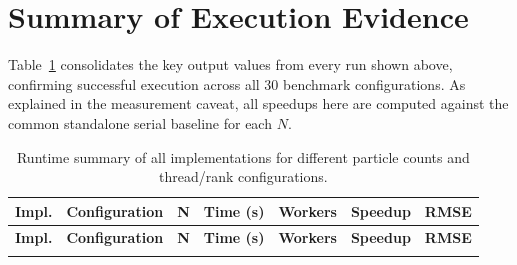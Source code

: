 \documentclass[11pt,a4paper]{article}
\begin{document}
\section{Summary of Execution Evidence}
\label{sec:summary}

Table~\ref{tab:summary} consolidates the key output values from every run
shown above, confirming successful execution across all 30 benchmark
configurations. As explained in the measurement caveat, all speedups here are
computed against the common standalone serial baseline for each $N$.

\begin{longtable}{llrrrrl}
\caption{Runtime summary of all implementations for different particle counts
and thread/rank configurations.}
\label{tab:summary}\\
\toprule
\textbf{Impl.} & \textbf{Configuration} & \textbf{N} & \textbf{Time (s)} &
\textbf{Workers} & \textbf{Speedup} & \textbf{RMSE} \\
\midrule
\endfirsthead
\toprule
\textbf{Impl.} & \textbf{Configuration} & \textbf{N} & \textbf{Time (s)} &
\textbf{Workers} & \textbf{Speedup} & \textbf{RMSE} \\
\midrule
\endhead
\bottomrule
\endfoot


\end{longtable}
\end{document}
